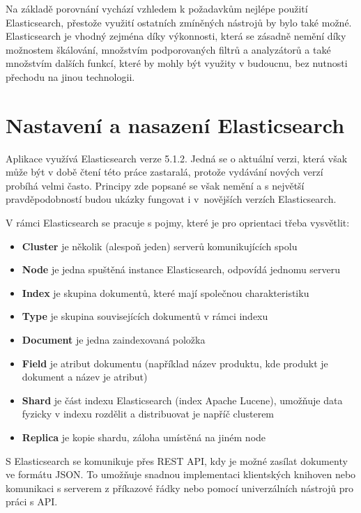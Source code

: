 \documentclass[FM,DP]{tulthesis}
\begin{document}
Na základě porovnání vychází vzhledem k požadavkům nejlépe použití Elasticsearch, 
přestože využití ostatních zmíněných nástrojů by bylo také možné. Elasticsearch
je vhodný zejména díky výkonnosti, která se zásadně nemění díky možnostem škálování, 
množstvím podporovaných filtrů a analyzátorů a také množstvím dalších funkcí, 
které by mohly být využity v budoucnu, bez nutnosti přechodu na jinou technologii.

\section{Nastavení a nasazení Elasticsearch}

Aplikace využívá Elasticsearch verze 5.1.2. Jedná se o aktuální verzi, která však
může být v době čtení této práce zastaralá, protože vydávání nových verzí probíhá
velmi často. Principy zde popsané se však nemění a s největší pravděpodobností 
budou ukázky fungovat i v~novějších verzích Elasticsearch.

V rámci Elasticsearch se pracuje s pojmy, které je pro oprientaci třeba vysvětlit:

\begin{itemize}
\item \textbf{Cluster} je několik (alespoň jeden) serverů komunikujících spolu
\item \textbf{Node} je jedna spuštěná instance Elasticsearch, odpovídá jednomu serveru
\item \textbf{Index} je skupina dokumentů, které mají společnou charakteristiku
\item \textbf{Type} je skupina souvisejících dokumentů v rámci indexu
\item \textbf{Document} je jedna zaindexovaná položka
\item \textbf{Field} je atribut dokumentu (například název produktu, kde produkt je dokument a název je atribut)
\item \textbf{Shard} je část indexu Elasticsearch (index Apache Lucene), umožňuje data fyzicky
v indexu rozdělit a distribuovat je napříč clusterem
\item \textbf{Replica} je kopie shardu, záloha umístěná na jiném node
\end{itemize}

S Elasticsearch se komunikuje přes REST API, kdy je možné zasílat dokumenty ve formátu JSON.
To umožňuje snadnou implementaci klientských knihoven nebo komunikaci s serverem
z příkazové řádky nebo pomocí univerzálních nástrojů pro práci s API.
\end{document}
